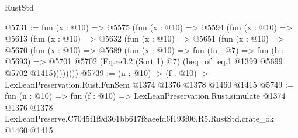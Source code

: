 \begin{lexlean}{RustStd}
\begin{coremodule}
@5731 := fun (x : @10) =>
  @5575
    (fun (x : @10) =>
    @5594
      (fun (x : @10) =>
      @5613
        (fun (x : @10) =>
        @5632
          (fun (x : @10) =>
          @5651
            (fun (x : @10) =>
            @5670
              (fun (x : @10) =>
              @5689
                (fun (x : @10) =>
                fun (fn : @7) =>
                fun (h : @5693) =>
                @5701 @5702 (Eq.refl.{2} (Sort 1) @7) (heq_of_eq.{1} @1399 @5699 @5702 @1415))))))))
@5739 := (n : @10) -> (f : @10) -> LexLeanPreservation.Rust.FunSem @1374 @1376 @1378 @1460 @1415
@5749 := fun (n : @10) =>
  fun (f : @10) =>
  LexLeanPreservation.Rust.simulate
    @1374
    @1376
    @1378
    LexLeanPreserve.C7045f1f9d361bb617f8aeefd6f193f06.R5.RustStd.crate_ok
    @1460
    @1415
\end{coremodule}
\end{lexlean}
